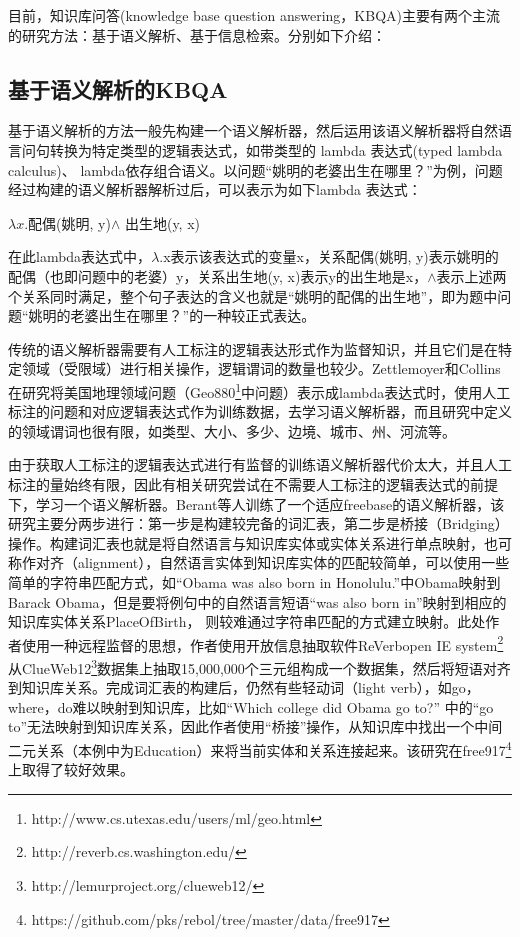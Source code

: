 目前，知识库问答(knowledge base question answering，KBQA)主要有两个主流的研究方法：基于语义解析、基于信息检索。分别如下介绍：

\subsection{基于语义解析的KBQA}
基于语义解析的方法一般先构建一个语义解析器，然后运用该语义解析器将自然语言问句转换为特定类型的逻辑表达式，如带类型的 lambda 表达式(typed lambda calculus)、 lambda依存组合语义。以问题“姚明的老婆出生在哪里？”为例，问题经过构建的语义解析器解析过后，可以表示为如下lambda 表达式：
\begin{center}
$\lambda x.$配偶(姚明, y)\space$\wedge$ 出生地(y, x)
\end{center}

在此lambda表达式中，$\lambda$.x表示该表达式的变量x，关系配偶(姚明, y)表示姚明的配偶（也即问题中的老婆）y，关系出生地(y, x)表示y的出生地是x，$\wedge$表示上述两个关系同时满足，整个句子表达的含义也就是“姚明的配偶的出生地”，即为题中问题“姚明的老婆出生在哪里？”的一种较正式表达。

传统的语义解析器需要有人工标注的逻辑表达形式作为监督知识，并且它们是在特定领域（受限域）进行相关操作，逻辑谓词的数量也较少\cite{Zettlemoyer}\cite{Wong}\cite{Kwiatkowski}。Zettlemoyer和Collins在研究将美国地理领域问题（Geo880\footnote{http://www.cs.utexas.edu/users/ml/geo.html}中问题）表示成lambda表达式时，使用人工标注的问题和对应逻辑表达式作为训练数据，去学习语义解析器，而且研究中定义的领域谓词也很有限，如类型、大小、多少、边境、城市、州、河流等。

由于获取人工标注的逻辑表达式进行有监督的训练语义解析器代价太大，并且人工标注的量始终有限，因此有相关研究尝试在不需要人工标注的逻辑表达式的前提下，学习一个语义解析器。Berant\cite{BerantCF}等人训练了一个适应freebase的语义解析器，该研究主要分两步进行：第一步是构建较完备的词汇表，第二步是桥接（Bridging）操作。构建词汇表也就是将自然语言与知识库实体或实体关系进行单点映射，也可称作对齐（alignment），自然语言实体到知识库实体的匹配较简单，可以使用一些简单的字符串匹配方式，如“Obama was also born in Honolulu.”中Obama映射到Barack Obama，但是要将例句中的自然语言短语“was also born in”映射到相应的知识库实体关系PlaceOfBirth， 则较难通过字符串匹配的方式建立映射。此处作者使用一种远程监督的思想，作者使用开放信息抽取软件ReVerbopen IE system\footnote{http://reverb.cs.washington.edu/}从ClueWeb12\footnote{http://lemurproject.org/clueweb12/}数据集上抽取15,000,000个三元组构成一个数据集，然后将短语对齐到知识库关系。完成词汇表的构建后，仍然有些轻动词（light verb），如go，where，do难以映射到知识库，比如“Which college did Obama go to?” 中的“go to”无法映射到知识库关系，因此作者使用“桥接”操作，从知识库中找出一个中间二元关系（本例中为Education）来将当前实体和关系连接起来。该研究在free917\footnote{https://github.com/pks/rebol/tree/master/data/free917}上取得了较好效果。

